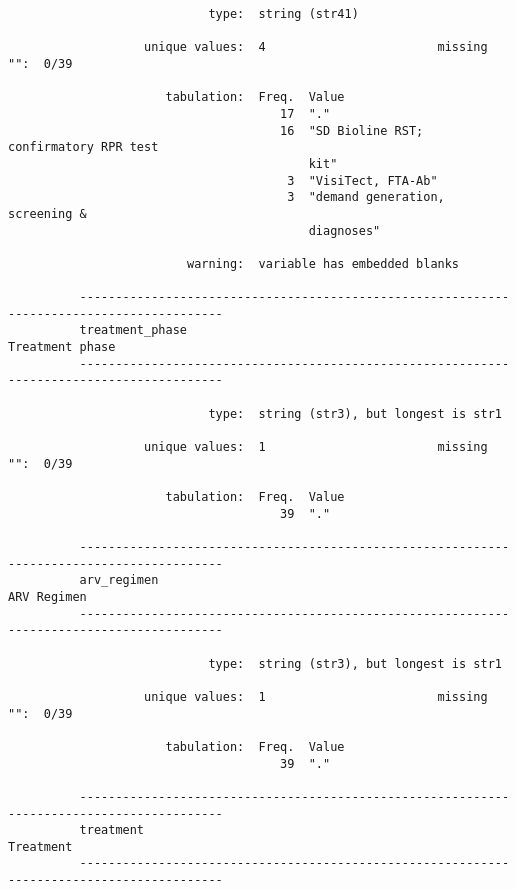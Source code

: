\documentclass{article}
\begin{document}
\begin{verbatim}
                            type:  string (str41)
          
                   unique values:  4                        missing "":  0/39
          
                      tabulation:  Freq.  Value
                                      17  "."
                                      16  "SD Bioline RST; confirmatory RPR test
                                          kit"
                                       3  "VisiTect, FTA-Ab"
                                       3  "demand generation, screening &
                                          diagnoses"
          
                         warning:  variable has embedded blanks
          
          ------------------------------------------------------------------------------------------
          treatment_phase                                                            Treatment phase
          ------------------------------------------------------------------------------------------
          
                            type:  string (str3), but longest is str1
          
                   unique values:  1                        missing "":  0/39
          
                      tabulation:  Freq.  Value
                                      39  "."
          
          ------------------------------------------------------------------------------------------
          arv_regimen                                                                    ARV Regimen
          ------------------------------------------------------------------------------------------
          
                            type:  string (str3), but longest is str1
          
                   unique values:  1                        missing "":  0/39
          
                      tabulation:  Freq.  Value
                                      39  "."
          
          ------------------------------------------------------------------------------------------
          treatment                                                                        Treatment
          ------------------------------------------------------------------------------------------
          

\end{verbatim}
\end{document}
